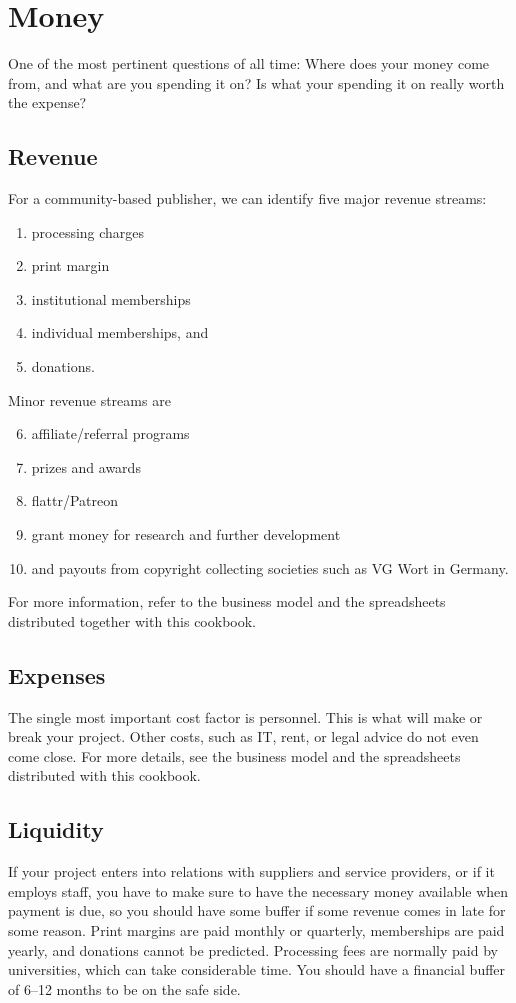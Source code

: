\documentclass[nonflat,modfonts,output=book] {langsci/langscibook}
\begin{document}
\section{Money}\label{sec:money}
One of the most pertinent questions of all time: Where does your money come from, and what are you spending it on? Is what your spending it on really worth the expense? 
\subsection{Revenue}
For a community-based publisher, we can identify five major revenue streams: 
\begin{enumerate}
 \item processing charges
 \item print margin
 \item institutional memberships
 \item individual memberships, and  
 \item donations.
\end{enumerate}

\noindent 
Minor revenue streams are 
\begin{enumerate}
\setcounter{enumi}{5}
 \item affiliate/referral programs
 \item prizes and awards
 \item flattr/Patreon
 \item  grant money for research and further development
 \item and payouts from copyright collecting societies such as VG Wort in Germany. 
\end{enumerate}
 
For more information, refer to the business model and the spreadsheets distributed together with this cookbook. 

\subsection{Expenses}
The single most important cost factor is personnel.  This is what will make or break your project. Other costs, such as IT, rent, or legal advice do not even come close. For more details, see the business model and the spreadsheets distributed with this cookbook. 


\subsection{Liquidity}
If your project enters into relations with suppliers and service providers, or if it employs staff, you have to make sure to have the necessary money available when payment is due, so you should have some buffer if some revenue comes in late for some reason. Print margins are paid monthly or quarterly, memberships are paid yearly, and donations cannot be predicted. Processing fees are normally paid by universities, which can take considerable time. You should have a financial buffer of 6--12 months to be on the safe side. 
\end{document}
